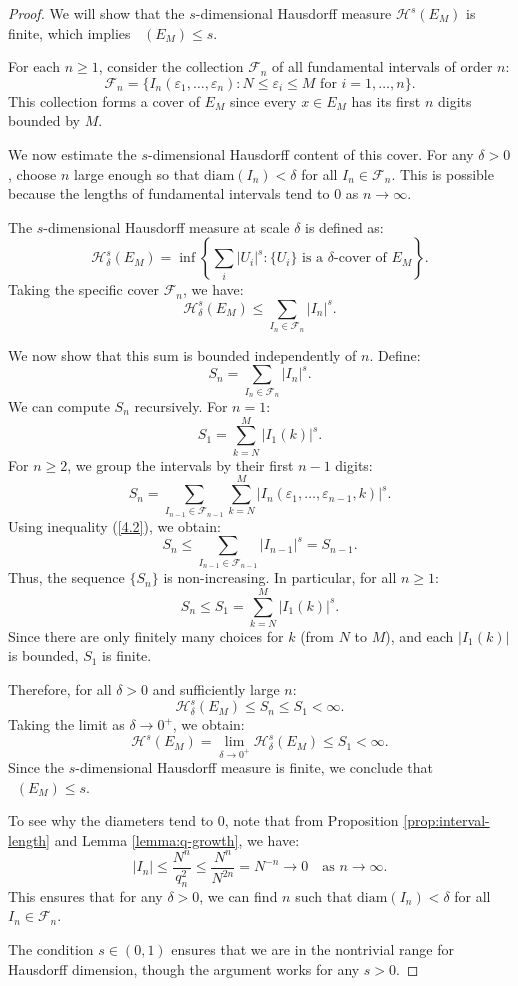 \documentclass[12pt]{article}
\numberwithin{equation}{section}
\DeclareMathOperator{\dimH}{dim_H}
\begin{document}
\begin{proof}
We will show that the $s$-dimensional Hausdorff measure $\mathcal{H}^s(E_M)$ is finite, which implies $\dimH(E_M) \leq s$.

For each $n \geq 1$, consider the collection $\mathcal{F}_n$ of all fundamental intervals of order $n$:
\[
\mathcal{F}_n = \{I_n(\varepsilon_1, \ldots, \varepsilon_n) : N \leq \varepsilon_i \leq M \text{ for } i = 1, \ldots, n\}.
\]
This collection forms a cover of $E_M$ since every $x \in E_M$ has its first $n$ digits bounded by $M$.

We now estimate the $s$-dimensional Hausdorff content of this cover. For any $\delta > 0$, choose $n$ large enough so that $\text{diam}(I_n) < \delta$ for all $I_n \in \mathcal{F}_n$. This is possible because the lengths of fundamental intervals tend to 0 as $n \to \infty$.

The $s$-dimensional Hausdorff measure at scale $\delta$ is defined as:
\[
\mathcal{H}^s_\delta(E_M) = \inf\left\{\sum_{i} |U_i|^s : \{U_i\} \text{ is a } \delta\text{-cover of } E_M\right\}.
\]
Taking the specific cover $\mathcal{F}_n$, we have:
\[
\mathcal{H}^s_\delta(E_M) \leq \sum_{I_n \in \mathcal{F}_n} |I_n|^s.
\]

We now show that this sum is bounded independently of $n$. Define:
\[
S_n = \sum_{I_n \in \mathcal{F}_n} |I_n|^s.
\]
We can compute $S_n$ recursively. For $n = 1$:
\[
S_1 = \sum_{k=N}^{M} |I_1(k)|^s.
\]
For $n \geq 2$, we group the intervals by their first $n-1$ digits:
\[
S_n = \sum_{I_{n-1} \in \mathcal{F}_{n-1}} \sum_{k=N}^{M} |I_n(\varepsilon_1, \ldots, \varepsilon_{n-1}, k)|^s.
\]
Using inequality (\ref{4.2}), we obtain:
\[
S_n \leq \sum_{I_{n-1} \in \mathcal{F}_{n-1}} |I_{n-1}|^s = S_{n-1}.
\]
Thus, the sequence $\{S_n\}$ is non-increasing. In particular, for all $n \geq 1$:
\[
S_n \leq S_1 = \sum_{k=N}^{M} |I_1(k)|^s.
\]
Since there are only finitely many choices for $k$ (from $N$ to $M$), and each $|I_1(k)|$ is bounded, $S_1$ is finite.

Therefore, for all $\delta > 0$ and sufficiently large $n$:
\[
\mathcal{H}^s_\delta(E_M) \leq S_n \leq S_1 < \infty.
\]
Taking the limit as $\delta \to 0^+$, we obtain:
\[
\mathcal{H}^s(E_M) = \lim_{\delta \to 0^+} \mathcal{H}^s_\delta(E_M) \leq S_1 < \infty.
\]
Since the $s$-dimensional Hausdorff measure is finite, we conclude that $\dimH(E_M) \leq s$.

To see why the diameters tend to 0, note that from Proposition \ref{prop:interval-length} and Lemma \ref{lemma:q-growth}, we have:
\[
|I_n| \leq \frac{N^n}{q_n^2} \leq \frac{N^n}{N^{2n}} = N^{-n} \to 0 \quad \text{as } n \to \infty.
\]
This ensures that for any $\delta > 0$, we can find $n$ such that $\text{diam}(I_n) < \delta$ for all $I_n \in \mathcal{F}_n$.

The condition $s \in (0,1)$ ensures that we are in the nontrivial range for Hausdorff dimension, though the argument works for any $s > 0$.
\end{proof}
\end{document}
